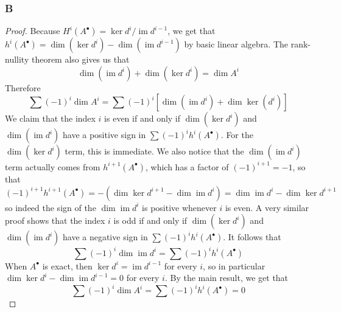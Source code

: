 \documentclass{article}
\DeclareMathOperator{\im}{im}
\begin{document}
\subsubsection{B}\label{1.6.B}
\begin{proof}
    Because $H^i(A^\bullet)=\ker d^i/\im d^{i-1}$, we get that $h^i(A^\bullet)=\dim(\ker d^i)-\dim (\im d^{i-1})$ by basic linear algebra. The rank-nullity theorem also gives us that
    \[
    \dim(\im d^i)+\dim(\ker d^i)=\dim A^i
    \]
    Therefore
    \[
    \sum (-1)^i \dim A^i=\sum (-1)^i [\dim(\im d^i)+\dim \ker(d^i)]
    \]
   We claim that the index $i$ is even if and only if $\dim(\ker d^i)$ and $\dim(\im d^i)$ have a positive sign in $\sum (-1)^i h^i(A^\bullet)$. For the $\dim(\ker d^i)$ term, this is immediate. We also notice that the $\dim(\im d^i)$ term actually comes from $h^{i+1}(A^\bullet)$, which has a factor of $(-1)^{i+1}=-1$, so that 
   \[
   (-1)^{i+1} h^{i+1}(A^\bullet)=-(\dim \ker d^{i+1}- \dim \im d^i)=\dim \im d^i-\dim \ker d^{i+1}
   \]
   so indeed the sign of the $\dim \im d^i$ is positive whenever $i$ is even. A very similar proof shows that the index $i$ is odd if and only if $\dim(\ker d^i)$ and $\dim(\im d^i)$ have a negative sign in $\sum (-1)^i h^i(A^\bullet)$. It follows that
   \[
   \sum (-1)^i \dim \im d^i=\sum (-1)^i h^i(A^\bullet)
   \]
   When $A^\bullet$ is exact, then $\ker d^i=\im d^{i-1}$ for every $i$, so in particular $\dim \ker d^i-\dim \im d^{i-1}=0$ for every $i$. By the main result, we get that
   \[
   \sum (-1)^i \dim A^i=\sum (-1)^i h^i(A^\bullet)=0
   \]
\end{proof}
\end{document}
